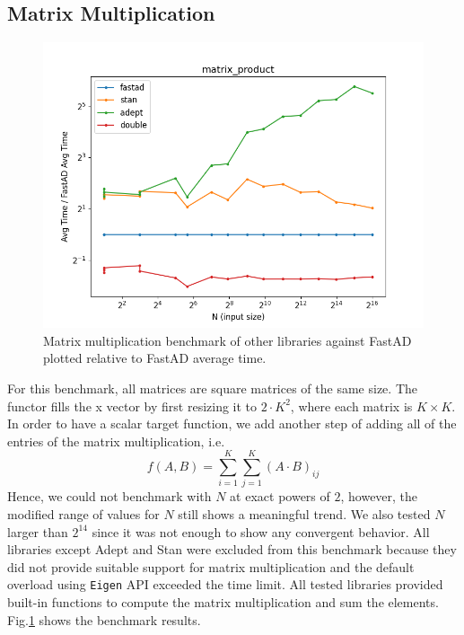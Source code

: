 \subsection{Matrix Multiplication}

\begin{figure}[t]
    \centering
    \includegraphics[width=\textwidth]{figs/matrix_product_fig.png}
    \caption{%
        Matrix multiplication benchmark of other libraries against FastAD 
        plotted relative to FastAD average time.
    }\label{fig:matrix_mult}
\end{figure}

For this benchmark, all matrices are square matrices of the same size.
The functor fills the x vector by first resizing it to $2 \cdot K^2$,
where each matrix is $K\times K$.
In order to have a scalar target function,
we add another step of adding all of the entries of the matrix multiplication, i.e.
\[
    f(A, B) = \sum\limits_{i=1}^{K} \sum\limits_{j=1}^{K} {(A \cdot B)}_{ij}
\]
Hence, we could not benchmark with $N$ at exact powers of $ 2$,
however, the modified range of values for $N$ still shows a meaningful trend.
We also tested $N$ larger than $2^{14}$ since it was not enough to show any convergent behavior.
All libraries except Adept and Stan were excluded from this benchmark
because they did not provide suitable support for matrix multiplication
and the default overload using \verb|Eigen| API exceeded the time limit.
All tested libraries provided built-in functions to 
compute the matrix multiplication and sum the elements.
Fig.\ref{fig:matrix_mult} shows the benchmark results.

